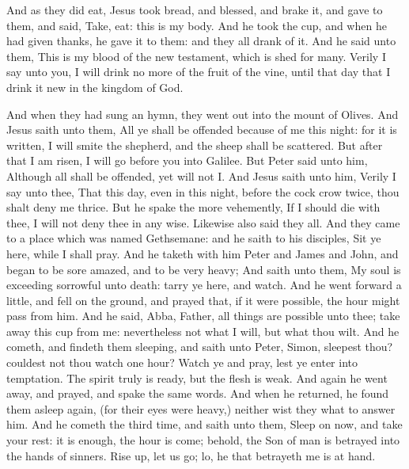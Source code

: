  And as they did eat, Jesus took bread, and blessed, and
brake it, and gave to them, and said, Take, eat: this is my body.
 And he took the cup, and when he had given thanks, he gave
it to them: and they all drank of it.  And he said unto
them, This is my blood of the new testament, which is shed for many.
 Verily I say unto you, I will drink no more of the fruit
of the vine, until that day that I drink it new in the kingdom of God.

 And when they had sung an hymn, they went out into the
mount of Olives.  And Jesus saith unto them, All ye shall
be offended because of me this night: for it is written, I will smite
the shepherd, and the sheep shall be scattered.  But after
that I am risen, I will go before you into Galilee.  But
Peter said unto him, Although all shall be offended, yet will not I.
 And Jesus saith unto him, Verily I say unto thee, That
this day, even in this night, before the cock crow twice, thou shalt
deny me thrice.  But he spake the more vehemently, If I
should die with thee, I will not deny thee in any wise. Likewise also
said they all.  And they came to a place which was named
Gethsemane: and he saith to his disciples, Sit ye here, while I shall
pray.  And he taketh with him Peter and James and John, and
began to be sore amazed, and to be very heavy;  And saith
unto them, My soul is exceeding sorrowful unto death: tarry ye here, and
watch.  And he went forward a little, and fell on the
ground, and prayed that, if it were possible, the hour might pass from
him.  And he said, Abba, Father, all things are possible
unto thee; take away this cup from me: nevertheless not what I will, but
what thou wilt.  And he cometh, and findeth them sleeping,
and saith unto Peter, Simon, sleepest thou? couldest not thou watch one
hour?  Watch ye and pray, lest ye enter into temptation.
The spirit truly is ready, but the flesh is weak.  And
again he went away, and prayed, and spake the same words. 
And when he returned, he found them asleep again, (for their eyes were
heavy,) neither wist they what to answer him.  And he
cometh the third time, and saith unto them, Sleep on now, and take your
rest: it is enough, the hour is come; behold, the Son of man is betrayed
into the hands of sinners.  Rise up, let us go; lo, he that
betrayeth me is at hand.

